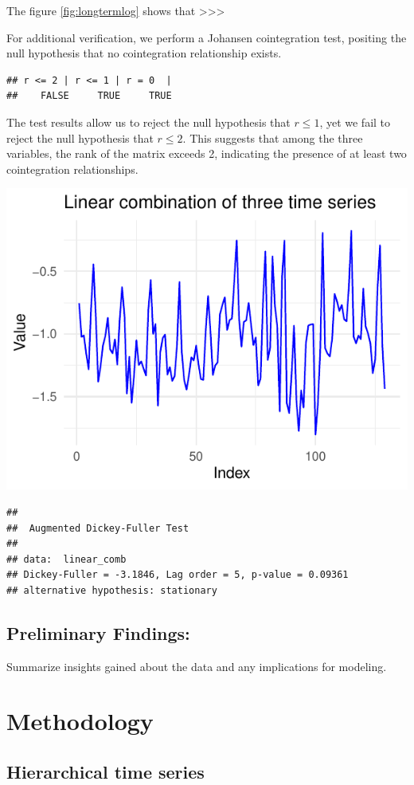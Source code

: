 \documentclass[11pt,a4paper,]{article}
\begin{document}
The figure \ref{fig:longtermlog} shows that \textgreater\textgreater\textgreater{}

For additional verification, we perform a Johansen cointegration test, positing the null hypothesis that no cointegration relationship exists.

\begin{verbatim}
## r <= 2 | r <= 1 | r = 0  | 
##    FALSE     TRUE     TRUE
\end{verbatim}

The test results allow us to reject the null hypothesis that \(r \leq 1\), yet we fail to reject the null hypothesis that \(r \leq 2\). This suggests that among the three variables, the rank of the matrix exceeds 2, indicating the presence of at least two cointegration relationships.

\includegraphics[width=0.5\linewidth,]{Final_Report_files/figure-latex/s_plot-1}

\begin{verbatim}
## 
##  Augmented Dickey-Fuller Test
## 
## data:  linear_comb
## Dickey-Fuller = -3.1846, Lag order = 5, p-value = 0.09361
## alternative hypothesis: stationary
\end{verbatim}

\subsection{Preliminary Findings:}\label{preliminary-findings}

Summarize insights gained about the data and any implications for modeling.

\section{Methodology}\label{methodology}

\subsection{Hierarchical time series}\label{hierarchical-time-series}
\end{document}
